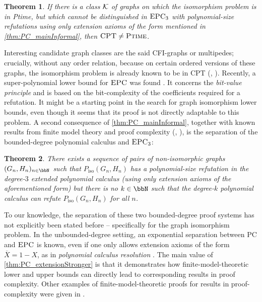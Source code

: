 \documentclass[10pt,a4paper]{article}
\newtheorem{theorem}{Theorem}
\newcommand{\CPT}{\mbox{\sc CPT}}
\newcommand{\EPC}{\mbox{\sc EPC}}
\newcommand{\PC}{\textrm {PC}}
\newcommand{\ptime}{\mbox{\sc Ptime}}
\newcommand{\Kk}{{\cal K}}
\renewcommand{\bar}{\overline}
\newcommand{\Piso}{P_{\text{iso}}}
\begin{document}
	\begin{theorem}
		\label{thm:PC_mainLowerBound}
		If there is a class $\Kk$ of graphs on which the isomorphism problem is in \ptime, but which cannot be distinguished in $\EPC_3$ with polynomial-size refutations using only extension axioms of the form mentioned in \autoref{thm:PC_mainInformal}, then $\CPT \neq \ptime$.
	\end{theorem} 
	Interesting candidate graph classes are the said CFI-graphs or multipedes; crucially, without any order relation, because on certain ordered versions of these graphs, the isomorphism problem is already known to be in CPT (\cite{dawar2008}, \cite{multipedeIsomorphism}). Recently, a super-polynomial lower bound for $\EPC$ was found \cite{alekseev}. It concerns the \emph{bit-value principle} and is based on the bit-complexity of the coefficients required for a refutation. It might be a starting point in the search for graph isomorphism lower bounds, even though it seems that its proof is not directly adaptable to this problem. A second consequence of \autoref{thm:PC_mainInformal}, together with known results from finite model theory and proof complexity (\cite{dawar2008}, \cite{berkholz}), is the separation of the bounded-degree polynomial calculus and $\EPC_3$:
	\begin{theorem}
		\label{thm:PC_extensionStronger}
		There exists a sequence of pairs of non-isomorphic graphs $(G_n,H_n)_{n \in \bbN}$ such that $\Piso(G_n,H_n)$ has a polynomial-size refutation in the degree-$3$ extended polynomial calculus (using only extension axioms of the aforementioned form) but there is no $k \in \bbN$ such that the degree-$k$ polynomial calculus can refute $\Piso(G_n,H_n)$ for all $n$.
	\end{theorem}
	To our knowledge, the separation of these two bounded-degree proof systems has not explicitly been stated before -- specifically for the graph isomorphism problem. In the unbounded-degree setting, an exponential separation between $\PC$ and $\EPC$ is known, even if one only allows extension axioms of the form $\bar{X} = 1 - X$, as in \emph{polynomial calculus resolution} \cite{massimoPCR}.
	The main value of \autoref{thm:PC_extensionStronger} is that it demonstrates how finite-model-theoretic lower and upper bounds can directly lead to corresponding results in proof complexity. Other examples of finite-model-theoretic proofs for results in proof-complexity were given in \cite{ggpp}.
	
	
\end{document}

